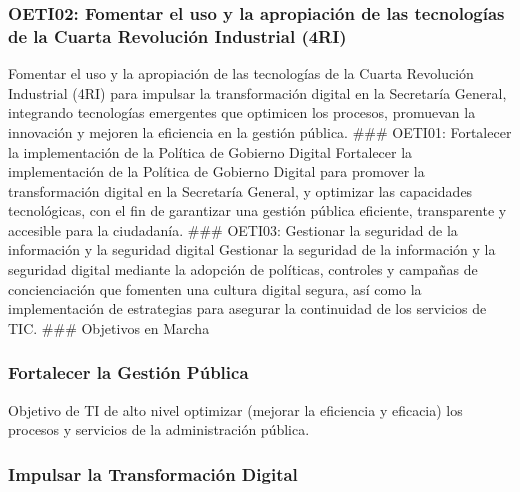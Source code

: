 \documentclass[
	a4paper, %
	12pt, %
]{include/CSSullivanBusinessReport}
\begin{document}
\subsubsection{OETI02: Fomentar el uso y la apropiación de las
tecnologías de la Cuarta Revolución Industrial
(4RI)}\label{sec:oeti02-fomentar-el-uso-y-la-apropiaciuxf3n-de-las-tecnologuxedas-de-la-cuarta-revoluciuxf3n-industrial-4ri}

Fomentar el uso y la apropiación de las tecnologías de la Cuarta
Revolución Industrial (4RI) para impulsar la transformación digital en
la Secretaría General, integrando tecnologías emergentes que optimicen
los procesos, promuevan la innovación y mejoren la eficiencia en la
gestión pública. \#\#\# OETI01: Fortalecer la implementación de la
Política de Gobierno Digital Fortalecer la implementación de la Política
de Gobierno Digital para promover la transformación digital en la
Secretaría General, y optimizar las capacidades tecnológicas, con el fin
de garantizar una gestión pública eficiente, transparente y accesible
para la ciudadanía. \#\#\# OETI03: Gestionar la seguridad de la
información y la seguridad digital Gestionar la seguridad de la
información y la seguridad digital mediante la adopción de políticas,
controles y campañas de concienciación que fomenten una cultura digital
segura, así como la implementación de estrategias para asegurar la
continuidad de los servicios de TIC. \#\#\# Objetivos en Marcha

\subsubsection{Fortalecer la Gestión
Pública}\label{sec:fortalecer-la-gestiuxf3n-puxfablica}

Objetivo de TI de alto nivel optimizar (mejorar la eficiencia y
eficacia) los procesos y servicios de la administración pública.

\subsubsection{Impulsar la Transformación
Digital}\label{sec:impulsar-la-transformaciuxf3n-digital}
\end{document}
